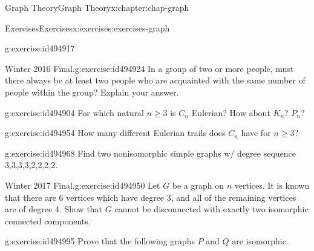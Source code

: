 \documentclass[oneside,10pt,]{book}
\numberwithin{equation}{section}
\begin{document}
\begin{chapterptx}{Graph Theory}{}{Graph Theory}{}{}{x:chapter:chap-graph}
\begin{exercises-section}{Exercises}{}{Exercises}{}{}{x:exercises:exercises-graph}
\begin{divisionexercise}{6}{}{}{g:exercise:id494917}
\end{divisionexercise}%
\begin{divisionexercise}{7}{Winter 2016 Final.}{}{g:exercise:id494924}%
In a group of two or more people, must there always be at least two people who are acquainted with the same number of people within the group? Explain your answer.%
\end{divisionexercise}%
\begin{divisionexercise}{8}{}{}{g:exercise:id494904}%
For which natural \(n \geq 3\) is \(C_n\) Eulerian? How about \(K_n\)? \(P_n\)?%
\end{divisionexercise}%
\begin{divisionexercise}{9}{}{}{g:exercise:id494954}%
How many different Eulerian trails does \(C_n\) have for \(n \geq 3\)?%
\end{divisionexercise}%
\begin{divisionexercise}{10}{}{}{g:exercise:id494968}%
Find two nonisomorphic simple graphs w\slash{} degree sequence 3,3,3,3,2,2,2,2.%
\end{divisionexercise}%
\begin{divisionexercise}{11}{Winter 2017 Final.}{}{g:exercise:id494950}%
Let \(G\) be a graph on \(n\) vertices. It is known that there are 6 vertices which have degree 3, and all of the remaining vertices are of degree 4. Show that \(G\) cannot be disconnected with exactly two isomorphic connected components.%
\end{divisionexercise}%
\begin{divisionexercise}{12}{}{}{g:exercise:id494995}%
Prove that the following graphs \(P\) and \(Q\) are isomorphic.%
\begin{sidebyside}{2}{0.25}{0.25}{0.04}%
\begin{sbspanel}{0.24}%
\end{sbspanel}
\end{sidebyside}
\end{divisionexercise}
\end{exercises-section}
\end{chapterptx}
\end{document}
